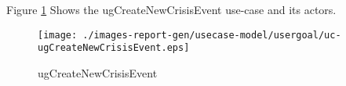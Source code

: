 \begin{usecase}

\end{usecase} 


Figure \ref{fig:lu.uni.lassy.excalibur.group09.spec-RE-UCD-uc-ugCreateNewCrisisEvent}
Shows the ugCreateNewCrisisEvent use-case and its actors.

\begin{figure}[htbp]
\begin{center}

\texttt{[image: ./images-report-gen/usecase-model/usergoal/uc-ugCreateNewCrisisEvent.eps]}
\end{center}
\caption[lu.uni.lassy.excalibur.group09.spec Use Case Diagram: uc-ugCreateNewCrisisEvent]{ugCreateNewCrisisEvent}
\label{fig:lu.uni.lassy.excalibur.group09.spec-RE-UCD-uc-ugCreateNewCrisisEvent}
\end{figure}
\vspace{0.5cm}
